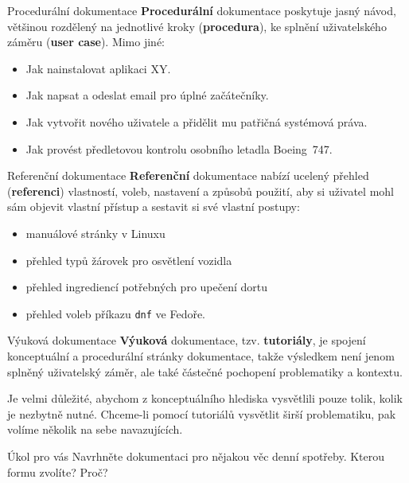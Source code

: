\documentclass[12pt,a4paper]{beamer}
\begin{document}
		\begin{frame}{Procedurální dokumentace}
		\textbf{Procedurální} dokumentace poskytuje jasný návod, většinou rozdělený na jednotlivé kroky (\textbf{procedura}), ke splnění uživatelského záměru (\textbf{user case}). Mimo jiné:
	
		\begin{itemize}
			\item Jak nainstalovat aplikaci XY.
			\item Jak napsat a odeslat email pro úplné začátečníky.
			\item Jak vytvořit nového uživatele a přidělit mu patřičná systémová práva.
			\item Jak provést předletovou kontrolu osobního letadla Boeing~747.
		\end{itemize}
		\end{frame}

		\begin{frame}{Referenční dokumentace}
		\textbf{Referenční} dokumentace nabízí ucelený přehled (\textbf{referenci}) vlastností, voleb, nastavení a způsobů použití, aby si uživatel mohl sám objevit vlastní přístup a sestavit si své vlastní postupy:

		\begin{itemize}
			\item manuálové stránky v Linuxu
			\item přehled typů žárovek pro osvětlení vozidla
			\item přehled ingrediencí potřebných pro upečení dortu
			\item přehled voleb příkazu \texttt{dnf} ve Fedoře.
		\end{itemize}
		\end{frame}

  	\begin{frame}{Výuková dokumentace}
		\textbf{Výuková} dokumentace, tzv. \textbf{tutoriály}, je spojení konceptuální a procedurální stránky dokumentace, takže výsledkem není jenom splněný uživatelský záměr, ale také částečné pochopení problematiky a kontextu.
		
		\vspace{5pt}
		
		Je velmi důležité, abychom z konceptuálního hlediska vysvětlili pouze tolik, kolik je nezbytně nutné. Chceme-li pomocí tutoriálů vysvětlit širší problematiku, pak volíme několik na sebe navazujících.	
	\end{frame}

	\begin{frame}{Úkol pro vás}
	Navrhněte dokumentaci pro nějakou věc denní spotřeby. Kterou formu zvolíte? Proč?
	\end{frame}
\end{document}
